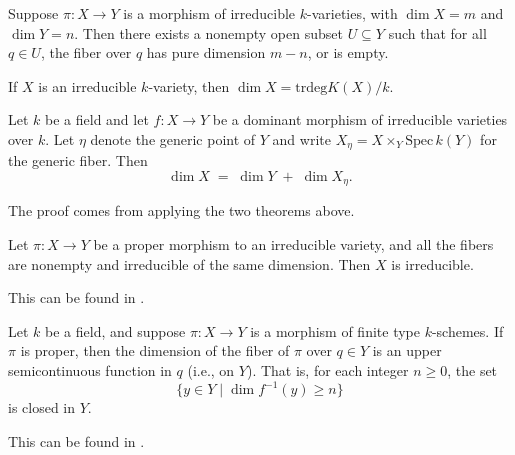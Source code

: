 
\begin{theorem}
    Suppose $\pi \colon X \to Y$ is a morphism of irreducible $k$-varieties, with $\dim X = m$ and $\dim Y = n$. Then there exists a nonempty open subset $U \subseteq Y$ such that for all $q \in U$, the fiber over $q$ has pure dimension $m-n$, or is empty.
\end{theorem}
\begin{theorem}
    If $X$ is an irreducible $k$-variety, then $\dim X = \mathrm{trdeg} K(X)/k$.  
\end{theorem}
\begin{theorem} \label{thm:fiber}
    Let $k$ be a field and let $f\colon X \to Y$ be a dominant morphism of irreducible varieties over $k$. Let $\eta$ denote the generic point of $Y$ and write $X_\eta = X \times_Y \mathrm{Spec}\,k(Y)$ for the generic fiber. Then
    \[
        \dim X \;=\; \dim Y \;+\; \dim X_\eta.
    \]
\end{theorem}
The proof comes from applying the two theorems above.

\begin{lemma}\label{lem:irred_fiber}
    Let $\pi \colon X \to Y$ be a proper morphism to an irreducible variety, and all the fibers are nonempty and irreducible of the same dimension. Then $X$ is irreducible.
\end{lemma}
This can be found in \cite[Exercise 14.4.21]{EO25}.

\begin{theorem}\label{thm:uppersemicont}
    Let $k$ be a field, and suppose $\pi \colon X \to Y$ is a morphism of finite type $k$-schemes. If $\pi$ is proper, then the dimension of the fiber of $\pi$ over $q \in Y$ is an upper semicontinuous function in $q$ (i.e., on $Y$). That is, for each integer $n \geq 0$, the set
    \[
        \{y \in Y \mid \dim f^{-1}(y) \geq n\}
    \]
    is closed in $Y$.
\end{theorem}
This can be found in \cite[Theorem 12.4.3]{Vak25}.


